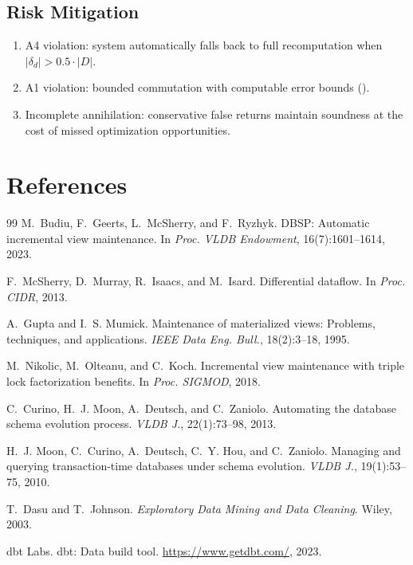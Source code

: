 \documentclass[11pt,a4paper]{article}
\theoremstyle{definition}
\begin{document}
\subsection{Risk Mitigation}

\begin{enumerate}[nosep]
  \item A4 violation: system automatically falls back to full recomputation
    when $|\delta_d| > 0.5 \cdot |D|$.
  \item A1 violation: bounded commutation with computable error bounds
    ().
  \item Incomplete annihilation: conservative false returns maintain soundness
    at the cost of missed optimization opportunities.
\end{enumerate}

\section*{References}

\begin{thebibliography}{99}
M.~Budiu, F.~Geerts, L.~McSherry, and F.~Ryzhyk.
\newblock DBSP: Automatic incremental view maintenance.
\newblock In \emph{Proc. VLDB Endowment}, 16(7):1601--1614, 2023.

F.~McSherry, D.~Murray, R.~Isaacs, and M.~Isard.
\newblock Differential dataflow.
\newblock In \emph{Proc. CIDR}, 2013.

A.~Gupta and I.~S. Mumick.
\newblock Maintenance of materialized views: Problems, techniques, and applications.
\newblock \emph{IEEE Data Eng. Bull.}, 18(2):3--18, 1995.

M.~Nikolic, M.~Olteanu, and C.~Koch.
\newblock Incremental view maintenance with triple lock factorization benefits.
\newblock In \emph{Proc. SIGMOD}, 2018.

C.~Curino, H.~J. Moon, A.~Deutsch, and C.~Zaniolo.
\newblock Automating the database schema evolution process.
\newblock \emph{VLDB J.}, 22(1):73--98, 2013.

H.~J. Moon, C.~Curino, A.~Deutsch, C.~Y. Hou, and C.~Zaniolo.
\newblock Managing and querying transaction-time databases under schema evolution.
\newblock \emph{VLDB J.}, 19(1):53--75, 2010.

T.~Dasu and T.~Johnson.
\newblock \emph{Exploratory Data Mining and Data Cleaning}.
\newblock Wiley, 2003.

dbt Labs.
\newblock dbt: Data build tool.
\newblock \url{https://www.getdbt.com/}, 2023.
\end{thebibliography}
\end{document}
